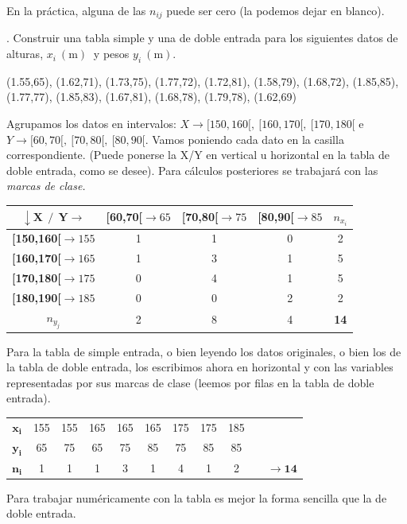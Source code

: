 En la práctica, alguna de las $n_{ij}$ puede ser cero (la podemos dejar en blanco).


\vspace{10mm} %
\begin{example}
. Construir una tabla simple y una de doble entrada para los siguientes datos de alturas, $x_i \ (\mathrm m)\ $  y pesos $y_i \ (\mathrm m)$.

\vspace{3mm} (1.55,65), (1.62,71), (1.73,75), (1.77,72), (1.72,81), (1.58,79), (1.68,72), (1.85,85), (1.77,77), (1.85,83), (1.67,81), (1.68,78), (1.79,78), (1.62,69)

\vspace{3mm} Agrupamos los datos en intervalos: $X \to [150,160[,\ [160,170[,\ [170,180[$ e $Y\to [60,70[, \ [70,80[,\ [80,90[$. Vamos poniendo cada dato en la casilla correspondiente. (Puede ponerse la X/Y en vertical u horizontal en la tabla de doble entrada, como se desee). Para cálculos posteriores se trabajará con las \emph{marcas de clase.}

\begin{table}[H]
\centering
\begin{tabular}{c|c|c|c|c}
$\boldsymbol{\downarrow X \ \ / \ \ Y \rightarrow}$ & \textbf{{[}60,70{[}$\to 65$} & \textbf{{[}70,80{[}$\to 75$} & \textbf{{[}80,90{[}$\to 85$} & \textbf{$n_{x_i}$} \\ \hline
\textbf{{[}150,160{[}$\to 155$} & 1 & 1 & 0 & 2 \\ \hline
\textbf{{[}160,170{[}$\to 165$} & 1 & 3 & 1 & 5 \\ \hline
\textbf{{[}170,180{[}$\to 175$} & 0 & 4 & 1 & 5 \\ \hline
\textbf{{[}180,190{[}$\to 185$} & 0 & 0 & 2 & 2 \\ \hline
\textbf{$n_{y_j}$} & 2 & 8 & 4 & \textbf{14}
\end{tabular}
\end{table}

Para la tabla de simple entrada, o bien leyendo los datos originales, o bien los de la tabla de doble entrada, los escribimos ahora en horizontal y con las variables representadas por sus marcas de clase (leemos por filas en la tabla de doble entrada).

\begin{table}[H]
\centering
\begin{tabular}{c|ccccccccc}
$\boldsymbol{x_i}$ & 155 & 155 & 165 & 165 & 165 & 175 & 175 & 185 &  \\ \cline{1-9}
$\boldsymbol{y_i}$ & 65 & 75 & 65 & 75 & 85 & 75 & 85 & 85 &  \\ \cline{1-9}
$\boldsymbol{n_i}$ & 1 & 1 & 1 & 3 & 1 & 4 & 1 & 2 & $\quad \to \boldsymbol{14}$
\end{tabular}
\end{table}
	
	Para trabajar numéricamente con la tabla es mejor la forma sencilla que la de doble entrada.
\end{example}

